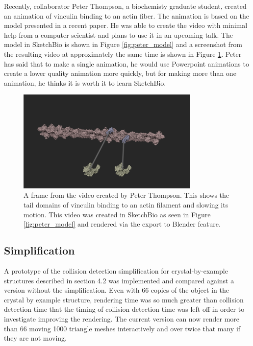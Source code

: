\documentclass{article} %
\begin{document}
Recently, collaborator Peter Thompson, a biochemisty graduate student, created an animation of vinculin binding to an actin fiber.  The animation is based on the model presented in a recent paper.  He was able to create the video with minimal help from a computer scientist and plans to use it in an upcoming talk.  The model in SketchBio is shown in Figure \ref{fig:peter_model} and a screenshot from the resulting video at approximately the same time is shown in Figure \ref{fig:peter_video}.  Peter has said that to make a single animation, he would use Powerpoint animations to create a lower quality animation more quickly, but for making more than one animation, he thinks it is worth it to learn SketchBio.


\begin{figure}[h!]
\centering
\includegraphics[width=0.8\textwidth]{peter_video.png}
\caption{A frame from the video created by Peter Thompson.  This shows the tail domains of vinculin binding to an actin filament and slowing its motion.  This video was created in SketchBio as seen in Figure \ref{fig:peter_model} and rendered via the export to Blender feature.}
\label{fig:peter_video}
\end{figure}

\subsection{Simplification}
A prototype of the collision detection simplification for crystal-by-example structures described in section 4.2 was implemented and compared against a version without the simplification.  Even with 66 copies of the object in the crystal by example structure, rendering time was so much greater than collision detection time that the timing of collision detection time was left off in order to investigate improving the rendering.  The current version can now render more than 66 moving 1000 triangle meshes interactively and over twice that many if they are not moving.
\end{document}
